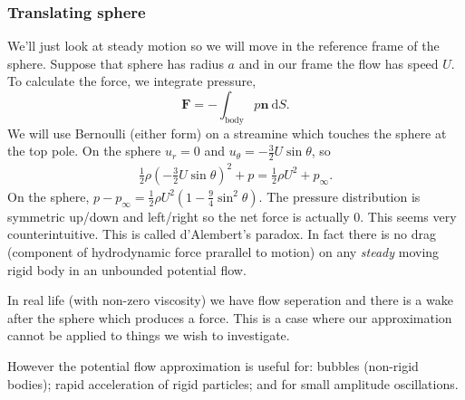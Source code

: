\documentclass{article}
\begin{document}
\subsubsection{Translating sphere}
We'll just look at steady motion so we will move in the reference frame of the sphere. Suppose that sphere has radius $ a $ and in our frame the flow has speed $ U $. To calculate the force, we integrate pressure,
\[
	\mathbf F = -\int_{\text{body}} p\mathbf n \ \mathrm dS.
\]
We will use Bernoulli (either form) on a streamine which touches the sphere at the top pole. On the sphere $ u_r = 0 $ and $ u_\theta = - \frac 32 U \sin\theta $, so
\begin{align*}
  \frac 12 \rho \left(-\frac 32 U \sin\theta\right)^2 +p = \frac 12 \rho U^2 + p_\infty.
\end{align*}
On the sphere, $ p-p_\infty=\frac 12 \rho U^2\left(1-\frac94 \sin^2\theta\right) $. The pressure distribution is symmetric up/down and left/right so the net force is actually $ 0 $. This seems very counterintuitive. This is called d'Alembert's paradox. In fact there is no drag (component of hydrodynamic force prarallel to motion) on any \textit{steady} moving rigid body in an unbounded potential flow. 
\par
In real life (with non-zero viscosity) we have flow seperation and there is a wake after the sphere which produces a force. This is a case where our approximation cannot be applied to things we wish to investigate.\par
However the potential flow approximation is useful for: bubbles (non-rigid bodies); rapid acceleration of rigid particles; and for small amplitude oscillations.
\end{document}
